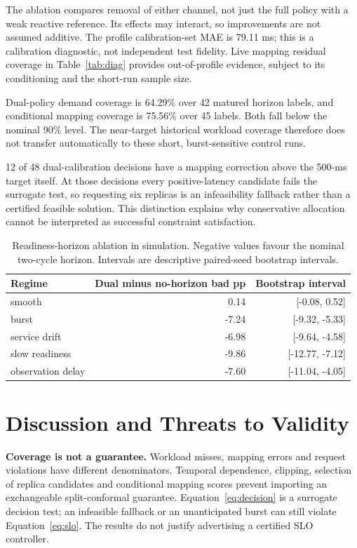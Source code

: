\documentclass[11pt,a4paper]{article}
\begin{document}
The ablation compares removal of either channel, not just the full policy with a weak reactive reference. Its effects may interact, so improvements are not assumed additive. The profile calibration-set MAE is 79.11 ms; this is a calibration diagnostic, not independent test fidelity. Live mapping residual coverage in Table~\ref{tab:diag} provides out-of-profile evidence, subject to its conditioning and the short-run sample size.

Dual-policy demand coverage is 64.29\% over 42 matured horizon labels, and conditional mapping coverage is 75.56\% over 45 labels. Both fall below the nominal 90\% level. The near-target historical workload coverage therefore does not transfer automatically to these short, burst-sensitive control runs.

12 of 48 dual-calibration decisions have a mapping correction above the 500-ms target itself. At those decisions every positive-latency candidate fails the surrogate test, so requesting six replicas is an infeasibility fallback rather than a certified feasible solution. This distinction explains why conservative allocation cannot be interpreted as successful constraint satisfaction.

\begin{table}[htbp]\centering\small\setlength{\tabcolsep}{4pt}
\caption{Readiness-horizon ablation in simulation. Negative values favour the nominal two-cycle horizon. Intervals are descriptive paired-seed bootstrap intervals.}\label{tab:delay}
\begin{tabular}{lrr}\toprule
Regime & Dual minus no-horizon bad pp & Bootstrap interval\\\midrule
smooth & 0.14 & [-0.08, 0.52]\\
burst & -7.24 & [-9.32, -5.33]\\
service drift & -6.98 & [-9.64, -4.58]\\
slow readiness & -9.86 & [-12.77, -7.12]\\
observation delay & -7.60 & [-11.04, -4.05]\\
\bottomrule\end{tabular}\end{table}


\section{Discussion and Threats to Validity}
\textbf{Coverage is not a guarantee.} Workload misses, mapping errors and request violations have different denominators. Temporal dependence, clipping, selection of replica candidates and conditional mapping scores prevent importing an exchangeable split-conformal guarantee. Equation~\ref{eq:decision} is a surrogate decision test; an infeasible fallback or an unanticipated burst can still violate Equation~\ref{eq:slo}. The results do not justify advertising a certified SLO controller.
\end{document}
